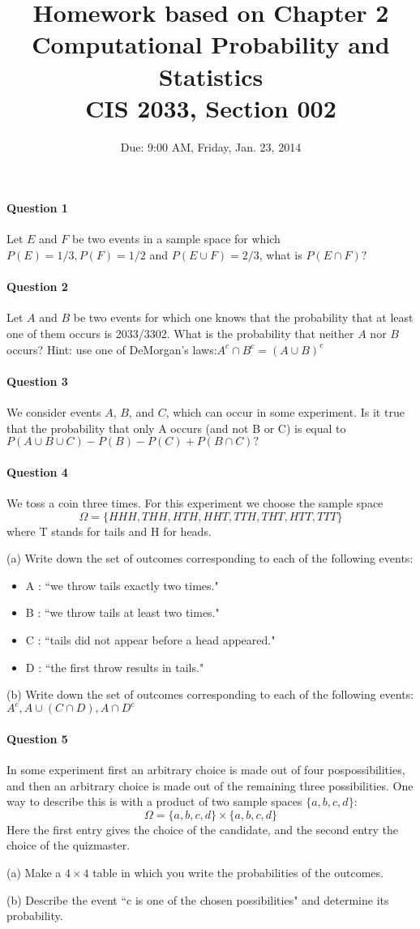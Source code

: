 \documentclass[11pt]{article} %
\title{Homework based on Chapter 2\\
Computational Probability and Statistics \\
CIS 2033, Section 002}
\author{Due: 9:00 AM, Friday, Jan. 23, 2014}
\date{} %
\begin{document}
\maketitle

\paragraph*{Question 1}
Let $E$ and $F$ be two events in a sample space for which $P(E) = 1/3, P(F)=1/2$ and $P(E \cup F) = 2/3$, what is $P(E \cap F)?$

\paragraph*{Question 2}
Let $A$ and $B$ be two events for which one knows that the probability that at least one of them occurs is 2033/3302. What is the probability that neither $A$ nor $B$ occurs? Hint: use one of DeMorgan’s laws:$A^c \cap B^c = (A \cup B)^c$

\paragraph*{Question 3}
We consider events $A$, $B$, and $C$, which can occur in some experiment. Is it true that the probability that only A occurs (and not B or C) is equal to $P(A \cup B \cup C) - P(B) - P(C) + P(B \cap C)?$

\paragraph*{Question 4}
We toss a coin three times. For this experiment we choose the sample space
\[
\Omega = \{HHH, THH, HTH, HHT, TTH, THT, HTT, TTT \}
\]
where T stands for tails and H for heads.

(a) Write down the set of outcomes corresponding to each of the following
events:
\begin{itemize}
\item A : ``we throw tails exactly two times."
\item B : ``we throw tails at least two times."
\item C : ``tails did not appear before a head appeared."
\item D : ``the first throw results in tails."
\end{itemize}
(b) Write down the set of outcomes corresponding to each of the following
events:
$A^c , A \cup (C \cap D), A \cap D^c$

\paragraph*{Question 5}
In some experiment first an arbitrary choice is made out of four pospossibilities, and then an arbitrary choice is made out of the remaining three possibilities. One way to describe this is with a product of two sample spaces $\{a, b, c, d\}$:
\[
\Omega = \{a, b, c, d\} \times \{a, b, c, d\}
\]
Here the first entry gives the choice of the candidate, and the second entry the choice of the quizmaster.

(a) Make a $4 \times 4$ table in which you write the probabilities of the outcomes.

(b) Describe the event ``c is one of the chosen possibilities" and determine its probability.
\end{document}
